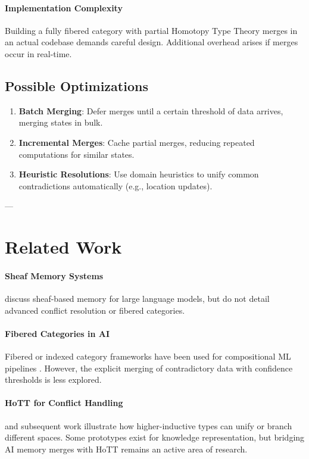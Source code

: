 \documentclass{article}
\begin{document}
\paragraph{Implementation Complexity}  
Building a fully fibered category with partial Homotopy Type Theory merges in an actual codebase demands careful design. Additional overhead arises if merges occur in real-time.

\subsection{Possible Optimizations}
\begin{enumerate}
    \item \textbf{Batch Merging}: Defer merges until a certain threshold of data arrives, merging states in bulk.  
    \item \textbf{Incremental Merges}: Cache partial merges, reducing repeated computations for similar states.  
    \item \textbf{Heuristic Resolutions}: Use domain heuristics to unify common contradictions automatically (e.g., location updates).
\end{enumerate}

---

\section{Related Work}
\label{sec:related}

\paragraph{Sheaf Memory Systems}  
\citet{sheafmemory2023design} discuss sheaf-based memory for large language models, but do not detail advanced conflict resolution or fibered categories.

\paragraph{Fibered Categories in AI}  
Fibered or indexed category frameworks have been used for compositional ML pipelines \citep{fong2019invitation}. However, the explicit merging of contradictory data with confidence thresholds is less explored.

\paragraph{HoTT for Conflict Handling}  
\citet{hottbook} and subsequent work illustrate how higher-inductive types can unify or branch different spaces. Some prototypes exist for knowledge representation, but bridging AI memory merges with HoTT remains an active area of research.
\end{document}
